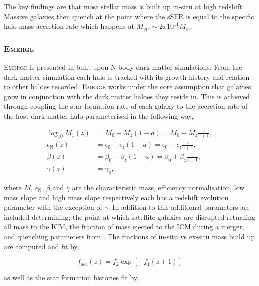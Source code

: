 The key findings are that most stellar mass is built up in-situ at high redshift. Massive galaxies then quench at the point where the sSFR is equal to the specific halo mass accretion rate which happens at $M_{vir} \sim 2 x 10^{11} M_{\odot}$.


\subsubsection{E\textsc{merge}}
E\textsc{merge} is presented in \citet{Moster2018Emerge10} built upon N-body dark matter simulations. From the dark matter simulation each halo is tracked with its growth history and relation to other haloes recorded. E\textsc{merge} works under the core assumption that galaxies grow in conjunction with the dark matter haloes they reside in. This is achieved through coupling the star formation rate of each galaxy to the accretion rate of the host dark matter halo parameterised in the following way,

\begin{equation}
\begin{aligned} \log _{10} M_{1}(z) &=M_{0}+M_{z}(1-a)=M_{0}+M_{z} \frac{z}{z+1}, \\ \epsilon_{\mathrm{N}}(z) &=\epsilon_{0}+\epsilon_{z}(1-a)=\epsilon_{0}+\epsilon_{z} \frac{z}{z+1}, \\ \beta(z) &=\beta_{0}+\beta_{z}(1-a)=\beta_{0}+\beta_{z} \frac{z}{z+1}, \\ \gamma(z) &=\gamma_{0}, \end{aligned}
\end{equation}

where $M$, $\epsilon_{\mathrm{N}}$, $\beta$ and $\gamma$ are the characteristic mass, efficiency normalisation, low mass slope and high mass slope respectively each has a redshift evolution parameter with the exception of $\gamma$. In addition to this additional parameters are included determining; the point at which satellite galaxies are disrupted returning all mass to the ICM, the fraction of mass ejected to the ICM during a merger, and quenching parameters from \citet{Wetzel2013GalaxyUniverse}. The fractions of in-situ vs ex-situ mass build up are computed and fit by,

\begin{equation}
f_{\mathrm{acc}}(z) =f_{2} \exp \left[-f_{1}(z+1)\right] 
\end{equation}

as well as the star formation histories fit by,

